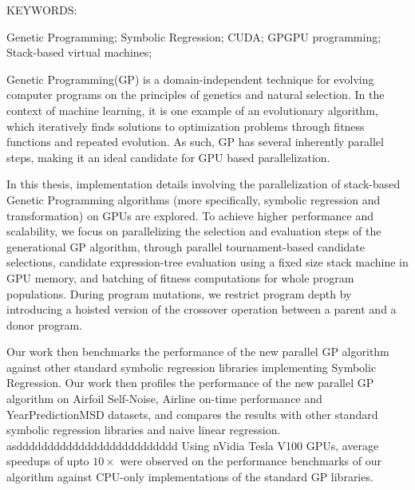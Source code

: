 \abstract

\noindent KEYWORDS: \hspace*{0.5em} 
\parbox[t]{4.4in}{  
  Genetic Programming;
	Symbolic Regression; 
  CUDA;
  GPGPU programming; 
  Stack-based virtual machines; 
}

\vspace*{24pt}

\noindent Genetic Programming(GP) is a domain-independent technique for evolving computer programs on the principles of genetics and natural selection. In the context of machine learning, it is one example of an evolutionary algorithm, which iteratively finds solutions to optimization problems through fitness functions and repeated evolution. As such, GP has several inherently parallel steps, making it an ideal candidate for GPU based parallelization. 

In this thesis, implementation details involving the parallelization of stack-based Genetic Programming algorithms (more specifically, symbolic regression and transformation) on GPUs are explored. To achieve higher performance and scalability, we focus on parallelizing the selection and evaluation steps of the generational GP algorithm, through parallel tournament-based candidate selections, candidate expression-tree evaluation using a fixed size stack machine in GPU memory, and batching of fitness computations for whole program populations. 
During program mutations, we restrict program depth by introducing a hoisted version of the crossover operation between a parent and a donor program. 

Our work then benchmarks the performance of the new parallel GP algorithm against other standard symbolic regression libraries implementing Symbolic Regression. 
Our work then profiles the performance of the new parallel GP algorithm on Airfoil Self-Noise, Airline on-time performance and YearPredictionMSD datasets, and compares the results with other standard symbolic regression libraries and naive linear regression. 
asdddddddddddddddddddddddddd
Using nVidia Tesla V100 GPUs, average speedups of upto $10 \times$ were observed on the performance benchmarks of our algorithm against CPU-only implementations of the standard GP libraries.
